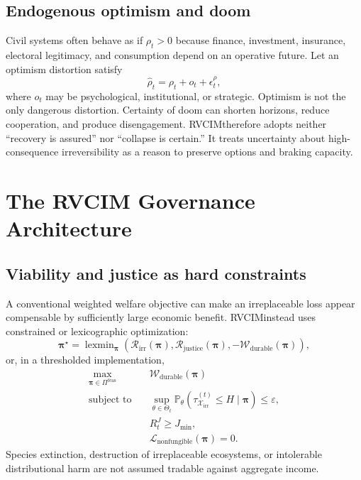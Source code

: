 \documentclass[11pt,a4paper]{article}
\numberwithin{equation}{section}
\theoremstyle{definition}
\theoremstyle{plain}
\theoremstyle{remark}
\newcommand{\Pp}{\mathbb{P}}
\newcommand{\RVCIM}{\textsc{RVCIM}}
\newcommand{\irrev}{\mathcal{X}_{\mathrm{irr}}}
\newcommand{\policy}{\boldsymbol{\pi}}
\begin{document}
\subsection{Endogenous optimism and doom}

Civil systems often behave as if $\rho_t>0$ because finance, investment, insurance, electoral legitimacy, and consumption depend on an operative future. Let an optimism distortion satisfy
\begin{equation}
\widehat\rho_t=\rho_t+o_t+\epsilon_t^{\rho},
\label{eq:optimism}
\end{equation}
where $o_t$ may be psychological, institutional, or strategic. Optimism is not the only dangerous distortion. Certainty of doom can shorten horizons, reduce cooperation, and produce disengagement. \RVCIM therefore adopts neither ``recovery is assured'' nor ``collapse is certain.'' It treats uncertainty about high-consequence irreversibility as a reason to preserve options and braking capacity.

\section{The RVCIM Governance Architecture}

\subsection{Viability and justice as hard constraints}

A conventional weighted welfare objective can make an irreplaceable loss appear compensable by sufficiently large economic benefit. \RVCIM instead uses constrained or lexicographic optimization:
\begin{equation}
\policy^{\star}
=\operatorname{lexmin}_{\policy}
\left(
\mathcal R_{\mathrm{irr}}(\policy),
\mathcal R_{\mathrm{justice}}(\policy),
-\mathcal W_{\mathrm{durable}}(\policy)
\right),
\label{eq:lexicographic}
\end{equation}
or, in a thresholded implementation,
\begin{align}
\max_{\policy\in\Pi^{\mathrm{feas}}}\quad
&\mathcal W_{\mathrm{durable}}(\policy) \\
\text{subject to}\quad
&\sup_{\theta\in\Theta_t}\Pp_{\theta}(\tau_{\irrev}^{(t)}\le H\mid\policy)\le\varepsilon, \\
&R_t^J\ge J_{\min}, \\
&\mathcal L_{\mathrm{nonfungible}}(\policy)=0.
\label{eq:hardconstraints}
\end{align}
Species extinction, destruction of irreplaceable ecosystems, or intolerable distributional harm are not assumed tradable against aggregate income.
\end{document}
